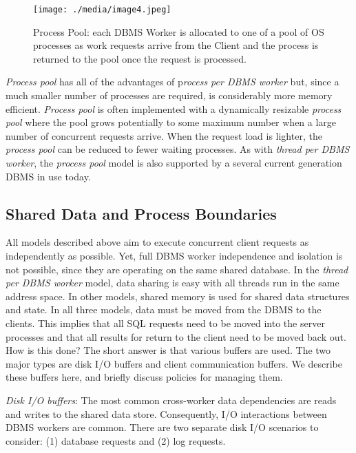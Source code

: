 \documentclass[b5paper,11pt,twoside,openright]{book}
\begin{document}
\begin{figure}
\texttt{[image: ./media/image4.jpeg]}

\caption{Process Pool: each DBMS Worker is allocated to one of a pool of
OS processes as work requests arrive from the Client and the process is
returned to the pool once the request is processed.\label{fig-2-3}}
\end{figure}

\emph{Process pool} has all of the advantages of p\emph{rocess per DBMS
worker} but, since a much smaller number of processes are required, is
considerably more memory efficient. \emph{Process pool} is often
implemented with a dynamically resizable \emph{process pool} where the
pool grows potentially to some maximum number when a large number of
concurrent requests arrive. When the request load is lighter, the
\emph{process pool} can be reduced to fewer waiting processes. As with
\emph{thread per DBMS worker}, the \emph{process pool} model is also
supported by a several current generation DBMS in use today.

\hypertarget{shared-data-and-process-boundaries}{%
\subsection{Shared Data and Process
Boundaries}\label{shared-data-and-process-boundaries}}

All models described above aim to execute concurrent client requests as
independently as possible. Yet, full DBMS worker independence and
isolation is not possible, since they are operating on the same shared
database. In the \emph{thread per DBMS worker} model, data sharing is
easy with all threads run in the same address space. In other models,
shared memory is used for shared data structures and state. In all three
models, data must be moved from the DBMS to the clients. This implies
that all SQL requests need to be moved into the server processes and
that all results for return to the client need to be moved back out. How
is this done? The short answer is that various buffers are used. The two
major types are disk I/O buffers and client communication buffers. We
describe these buffers here, and briefly discuss policies for managing
them.

\emph{Disk I/O buffers}: The most common cross-worker data dependencies
are reads and writes to the shared data store. Consequently, I/O
interactions between DBMS workers are common. There are two separate
disk I/O scenarios to consider: (1) database requests and (2) log
requests.
\end{document}

